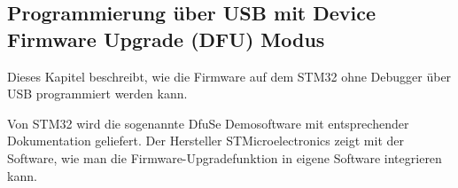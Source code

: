\subsection{Programmierung über USB mit Device Firmware Upgrade (DFU) Modus}
\label{sec:USBDFU}

Dieses Kapitel beschreibt, wie die Firmware auf dem STM32 ohne Debugger über USB programmiert werden kann.

Von STM32 wird die sogenannte DfuSe Demosoftware mit entsprechender Dokumentation geliefert. 
Der Hersteller STMicroelectronics zeigt mit der Software, wie man die Firmware-Upgradefunktion in eigene Software integrieren kann.


